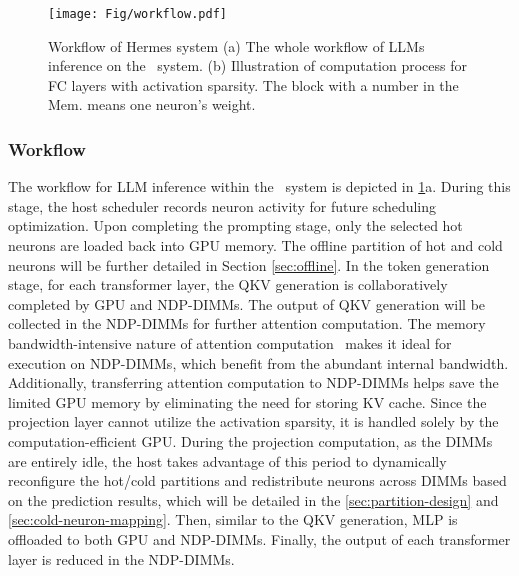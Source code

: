 
\begin{figure}[t]
    \centering
    \texttt{[image: Fig/workflow.pdf]}
    \vspace{-0.3cm}
    \caption{Workflow of Hermes system (a) The whole workflow of LLMs inference on the \name~system. (b) Illustration of computation process for FC layers with activation sparsity. The block with a number in the Mem. means one neuron's weight.}
    \label{fig:workflow}
\vspace{-0.3cm}
\end{figure}

\subsubsection{Workflow}

The workflow for LLM inference within the \name~system is depicted in \fig \ref{fig:workflow}a.  During this stage, the host scheduler records neuron activity for future scheduling optimization. Upon completing the prompting stage, only the selected hot neurons are loaded back into GPU memory. The offline partition of hot and cold neurons will be further detailed in Section \ref{sec:offline}.
In the token generation stage, for each transformer layer, the QKV generation is collaboratively completed by GPU and NDP-DIMMs. The output of QKV generation will be collected in the NDP-DIMMs for further attention computation. 
The memory bandwidth-intensive nature of attention computation~\cite{yu2022orca, park2024attacc} makes it ideal for execution on NDP-DIMMs, which benefit from the abundant internal bandwidth. Additionally, transferring attention computation to NDP-DIMMs helps save the limited GPU memory by eliminating the need for storing KV cache.
Since the projection layer cannot utilize the activation sparsity, it is handled solely by the computation-efficient GPU. During the projection computation, as the DIMMs are entirely idle, the host takes advantage of this period to dynamically reconfigure the hot/cold partitions and redistribute neurons across DIMMs based on the prediction results, which will be detailed in the \sec \ref{sec:partition-design} and \ref{sec:cold-neuron-mapping}. Then, similar to the QKV generation, MLP is offloaded to both GPU and NDP-DIMMs. Finally, the output of each transformer layer is reduced in the NDP-DIMMs. 

